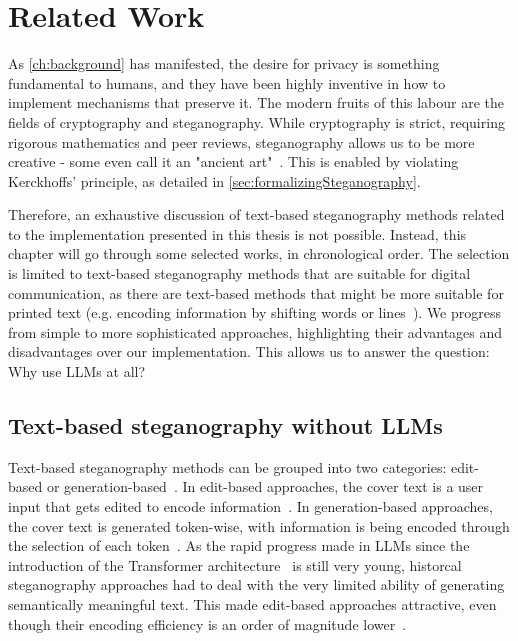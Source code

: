 
\chapter{Related Work}\label{ch:relatedwork}
\glsresetall %

As \cref{ch:background} has manifested, the desire for privacy is something fundamental to humans, and they have been highly inventive in how to implement mechanisms that preserve it. The modern fruits of this labour are the fields of cryptography and steganography. While cryptography is strict, requiring rigorous mathematics and peer reviews, steganography allows us to be more creative - some even call it an "ancient art"~\cite{bennettLinguisticSteganographySurvey2004}. This is enabled by violating Kerckhoffs' principle, as detailed in \cref{sec:formalizingSteganography}.

Therefore, an exhaustive discussion of text-based steganography methods related to the implementation presented in this thesis is not possible. Instead, this chapter will go through some selected works, in chronological order. The selection is limited to text-based steganography methods that are suitable for digital communication, as there are text-based methods that might be more suitable for printed text (e.g. encoding information by shifting words or lines~\cite{lowDocumentMarkingIdentification1995}). We progress from simple to more sophisticated approaches, highlighting their advantages and disadvantages over our implementation. This allows us to answer the question: Why use \glspl{LLM} at all?

\section{Text-based steganography without \glspl{LLM}}
\label{sec:textBasedSteganographyWithoutLLMs}
Text-based steganography methods can be grouped into two categories: edit-based or generation-based~\cite{zieglerNeuralLinguisticSteganography2019,bennettLinguisticSteganographySurvey2004}. In edit-based approaches, the cover text is a user input that gets edited to encode information~\cite{zieglerNeuralLinguisticSteganography2019}. In generation-based approaches, the cover text is generated token-wise, with information is being encoded through the selection of each token~\cite{zieglerNeuralLinguisticSteganography2019}. As the rapid progress made in \glspl{LLM} since the introduction of the Transformer architecture~\cite{vaswaniAttentionAllYou2023} is still very young, historcal steganography approaches had to deal with the very limited ability of generating semantically meaningful text. This made edit-based approaches attractive, even though their encoding efficiency is an order of magnitude lower~\cite{zieglerNeuralLinguisticSteganography2019}.

